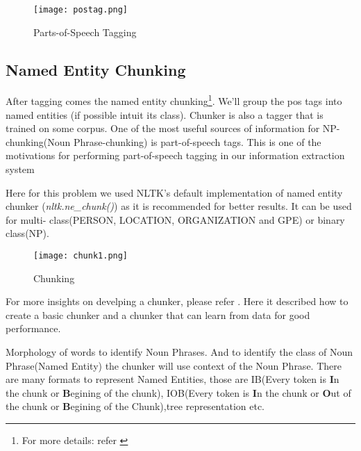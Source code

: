 \documentclass[12pt]{report}
\begin{document}
\begin{figure}[htp]
\centering
\texttt{[image: postag.png]}
\caption{Parts-of-Speech Tagging}
\label{pos}
\end{figure}

\subsection{Named Entity Chunking}
\par After tagging comes the named entity chunking\footnote{For more details: refer \cite{BookIE}}. We'll group the pos tags into named
 entities (if possible intuit its class). Chunker is also a tagger that is trained on some
  corpus.
One of the most useful sources of information for NP-chunking(Noun Phrase-chunking) is part-of-speech tags.
This is one of the motivations for performing part-of-speech tagging in our information extraction system
\par Here for this problem we used NLTK's default implementation of named entity chunker
(\textit{nltk.ne\_chunk()}) as it is recommended for better results. It can be used for multi-
class(PERSON, LOCATION, ORGANIZATION and GPE) or binary class(NP).

\begin{figure}[htp]
\centering
\texttt{[image: chunk1.png]}
\caption{Chunking}
\label{Chunk}
\end{figure}

\par For more insights on develping a chunker, please refer \cite{BookIE}. Here it described
 how to create a basic chunker and a chunker that can learn from data for good performance.
\par Morphology of words to identify Noun Phrases. And to identify the class of Noun Phrase(Named Entity) the chunker will use context of the Noun Phrase.
There are many formats to represent Named Entities, those are IB(Every token is \textbf{I}n the chunk or \textbf{B}egining of the chunk), IOB(Every token is \textbf{I}n the chunk or \textbf{O}ut of the chunk or \textbf{B}egining of the Chunk),tree representation etc.
\end{document}
